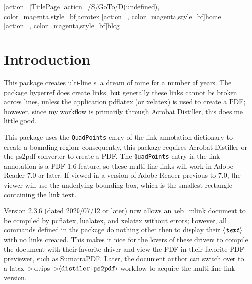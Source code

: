 \documentclass{article}
\def\anglemeta#1{$\langle\textit{\texttt{#1}}\rangle$}
\let\ameta\anglemeta
\let\pkg\textsf
\let\app\textsf
\begin{document}
\maketitle

[action={}]{TitlePage}
[action={/S/GoTo/D(undefined)},%
  color=magenta,style={bf}]{acrotex}
[action={},%
  color=magenta,style={bf}]{home}
[action={},%
  color=magenta,style={bf}]{blog}



\tableofcontents


\section{Introduction}

This package creates ulti-line s, a dream of mine
for a number of years. The package \pkg{hyperref} does create links,
but generally these links cannot be broken across lines, unless the
application \app{pdflatex} (or \app{xelatex}) is used to create a PDF;
however, since my workflow is primarily through \app{Acrobat Distiller}, this
does me little good.

This package uses the \texttt{QuadPoints} entry of the link annotation
dictionary to create a bounding region; consequently, this package
requires\marginpar{\small\raggedright\flushright \app{Distiller} or
\app{ps2pdf} required} \app{Acrobat Distiller} or the \app{ps2pdf}
converter to create a PDF. The \texttt{QuadPoints} entry in the link
annotation is a PDF 1.6 feature, so these multi-line links will work in
\app{Adobe Reader} 7.0 or later. If viewed in a version of \app{Adobe Reader}
previous to 7.0, the viewer will use the underlying bounding box, which is the
smallest rectangle containing the link text.

\newtopic\noindent
Version 2.3.6 (dated 2020/07/12 or later) now allows an \pkg{aeb\_mlink}
document to be compiled by \app{pdflatex}, \app{lualatex}, and \app{xelatex}
without errors; however, all commands defined in the package do nothing other
then to display their \ameta{text} with no links created. This makes it nice
for the lovers of these drivers to compile the document with their favorite
driver and view the PDF in their favorite PDF previewer, such as
\app{SumatraPDF}. Later, the document author can switch over to a
\app{latex\,->\,dvips\,->\ameta{\upshape{distiler\string|ps2pdf}}} workflow
to acquire the multi-line link version.
\end{document}

